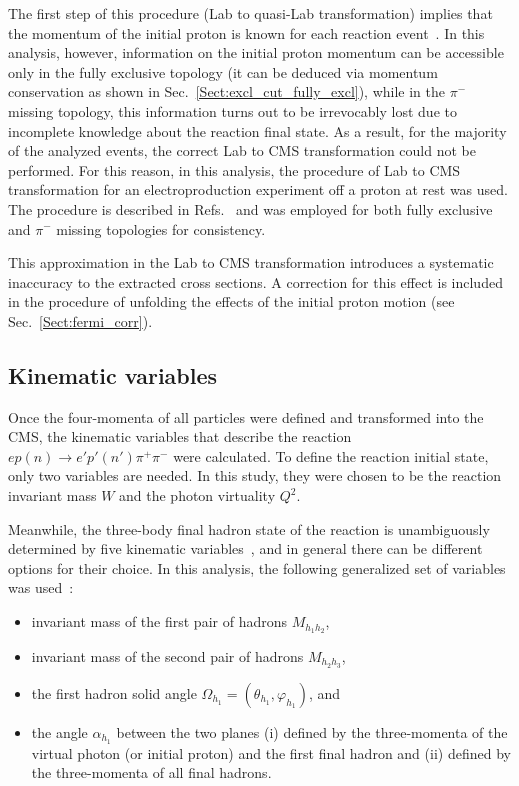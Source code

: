 \documentclass[prc,twocolumn,superscriptaddress,showpacs,amssymb,amsmath,amsfonts,aps,nofootinbib]{revtex4-1}
\begin{document}
The first step of this procedure (Lab to quasi-Lab transformation) implies that the momentum of the initial proton is known for each reaction event~\cite{twopeg-d}. In this analysis, however, information on the initial proton momentum can be accessible only in the fully exclusive topology (it can be deduced via momentum conservation as shown in Sec.\!~\ref{Sect:excl_cut_fully_excl}), while in the $\pi^{-}$ missing topology, this information turns out to be irrevocably lost due to incomplete knowledge about the reaction final state. As a result, for the majority of the analyzed events, the correct Lab to CMS transformation could not be performed. For this reason, in this analysis, the procedure of Lab to CMS transformation for an electroproduction experiment off a proton at rest was used. The procedure is described in Refs.\!~\cite{Fed_an_note:2017,Fed_paper_2018,my_an_note:2020, my_thesis:2021} and was employed for both fully exclusive and $\pi^{-}$ missing topologies for consistency.


This approximation in the Lab to CMS transformation introduces a systematic inaccuracy to the extracted cross sections. A correction for this effect is included in the procedure of unfolding the effects of the initial proton motion (see Sec.\!~\ref{Sect:fermi_corr}).



\subsection{Kinematic variables}
\label{Sect:kin_var}

Once the four-momenta of all particles were defined and transformed into the CMS, the kinematic variables that describe the reaction $ep(n) \rightarrow e'p'(n')\pi^{+}\pi^{-}$ were calculated. To define the reaction initial state, only two variables are needed. In this study, they were chosen to be the reaction invariant mass $W$ and the photon virtuality $Q^{2}$.

Meanwhile, the three-body final hadron state of the reaction is unambiguously determined by five kinematic variables~\cite{Fed_an_note:2017}, and in general there can be different options for their choice. In this analysis, the following generalized set of variables was used~\cite{Fed_an_note:2017,Fed_paper_2018,Byckling:1971vca,Isupov:2017lnd,Fedotov:2008aa,Mokeev:2015lda,my_an_note:2020, my_thesis:2021}:

\begin{itemize}
\item invariant mass of the first pair of hadrons $M_{h_{1}h_{2}}$,
\item invariant mass of the second pair of hadrons $M_{h_{2}h_{3}}$,
\item the first hadron solid angle $\Omega_{h_{1}}\! \!=\! (\theta_{h_{1}}, \varphi_{h_{1}})$, and
\item the angle $\alpha_{h_{1}}$ between the two planes (i) defined by the three-momenta of the virtual photon (or initial proton) and the first final hadron and (ii) defined by the three-momenta of all final hadrons.
\end{itemize}
\end{document}
